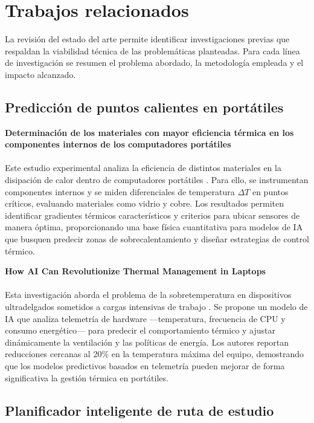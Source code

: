 \section{Trabajos relacionados}

La revisión del estado del arte permite identificar investigaciones previas que respaldan la viabilidad técnica de las problemáticas planteadas. Para cada línea de investigación se resumen el problema abordado, la metodología empleada y el impacto alcanzado.

\subsection{Predicción de puntos calientes en portátiles}

\textbf{Determinación de los materiales con mayor eficiencia térmica en los componentes internos de los computadores portátiles} \\\\
Este estudio experimental analiza la eficiencia de distintos materiales en la disipación de calor dentro de computadores portátiles \cite{investigacion_termica}. Para ello, se instrumentan componentes internos y se miden diferenciales de temperatura $\Delta T$ en puntos críticos, evaluando materiales como vidrio y cobre. Los resultados permiten identificar gradientes térmicos característicos y criterios para ubicar sensores de manera óptima, proporcionando una base física cuantitativa para modelos de IA que busquen predecir zonas de sobrecalentamiento y diseñar estrategias de control térmico.

\textbf{How AI Can Revolutionize Thermal Management in Laptops} \\\\
Esta investigación aborda el problema de la sobretemperatura en dispositivos ultradelgados sometidos a cargas intensivas de trabajo \cite{thermalAI}. Se propone un modelo de IA que analiza telemetría de hardware —temperatura, frecuencia de CPU y consumo energético— para predecir el comportamiento térmico y ajustar dinámicamente la ventilación y las políticas de energía. Los autores reportan reducciones cercanas al 20\% en la temperatura máxima del equipo, demostrando que los modelos predictivos basados en telemetría pueden mejorar de forma significativa la gestión térmica en portátiles.

\subsection{Planificador inteligente de ruta de estudio}

